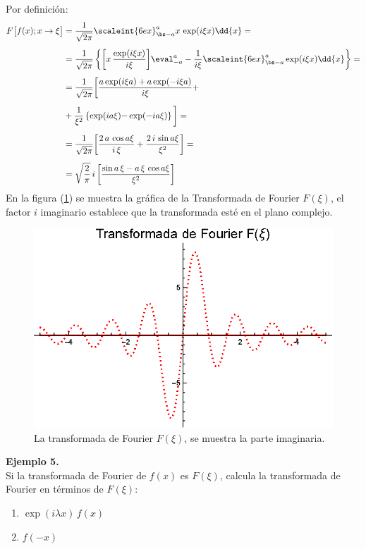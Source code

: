Por definición:
\begin{align*}
F \big[ f (x); x \to \xi \big] &= \dfrac{1}{\sqrt{2 \pi}} \scaleint{6ex}_{\bs -a}^{a} x \, \exp(i \xi x) \dd{x} = \\[0.5em]
&= \dfrac{1}{\sqrt{2 \pi}} \left\{ \bigg[ x \, \dfrac{\exp(i \xi x)}{i \xi} \bigg] \eval_{-a}^{a} - \dfrac{1}{i \xi} \scaleint{6ex}_{\bs -a}^{a} \exp(i \xi x) \dd{x} \right\} = \\[0,5em]
&= \dfrac{1}{\sqrt{2 \pi}} \bigg[ \dfrac{a \exp(i \xi a) + a \exp(-i \xi a)}{i \xi} {+} \\[0.5em]
&+ \dfrac{1}{\xi^{2}} \left\{ \exp(i a \xi) {-} \exp(-i a \xi) \right\} \bigg] = \\[0.5em]
&= \dfrac{1}{\sqrt{2 \pi}} \bigg[ \dfrac{2 \, a \, \cos a \xi}{i \, \xi} + \dfrac{2 \, i \, \sin a \xi}{\xi^{2}} \bigg] = \\[0.5em]
&= \sqrt{\dfrac{2}{\pi}} \, i \, \bigg[ \dfrac{\sin a \, \xi - a \, \xi \, \cos a \xi}{\xi^{2}} \bigg]
\end{align*}
En la figura (\ref{fig:figura_plot_Ejemplo_04_02}) se muestra la gráfica de la Transformada de Fourier $F (\xi)$, el factor $i$ imaginario establece que la transformada esté en el plano complejo.
\begin{figure}[H]
    \centering
    \includegraphics[scale=1]{Imagenes/Plot_Ejemplo_04_02.eps}
    \caption{La transformada de Fourier $F (\xi)$, se muestra la parte imaginaria.}
    \label{fig:figura_plot_Ejemplo_04_02}
\end{figure}
\noindent
\textbf{Ejemplo 5.}
\\
Si la transformada de Fourier de $f (x)$ es $F (\xi)$, calcula la transformada de Fourier en términos de $F (\xi)$:
\begin{enumerate}[label=\roman*)]
\item $\exp(i \lambda x) \, f (x)$
\item $f(-x)$
\end{enumerate}

